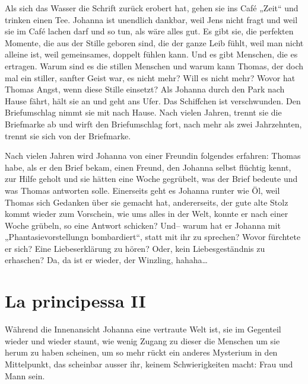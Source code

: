 \documentclass[10pt,titlepage,a5paper]{book}
\begin{document}
Als sich das Wasser die Schrift zurück erobert hat, gehen sie ins Café „Zeit“ und trinken einen Tee. Johanna ist unendlich dankbar, weil Jens nicht fragt und weil sie im Café lachen darf und so tun, als wäre alles gut. Es gibt sie, die perfekten Momente, die aus der Stille geboren sind, die der ganze Leib fühlt, weil man nicht alleine ist, weil gemeinsames, doppelt fühlen kann. Und es gibt Menschen, die es ertragen. Warum sind es die stillen Menschen und warum kann Thomas, der doch mal ein stiller, sanfter Geist war, es nicht mehr? Will es nicht mehr? Wovor hat Thomas Angst, wenn diese Stille einsetzt? Als Johanna durch den Park nach Hause fährt, hält sie an und geht ans Ufer. Das Schiffchen ist verschwunden. Den Briefumschlag nimmt sie mit nach Hause. Nach vielen Jahren, trennt sie die Briefmarke ab und wirft den Briefumschlag fort, nach mehr als zwei Jahrzehnten, trennt sie sich von der Briefmarke.

Nach vielen Jahren wird Johanna von einer Freundin folgendes erfahren: Thomas habe, als er den Brief bekam, einen Freund, den Johanna selbst flüchtig kennt, zur Hilfe geholt und sie hätten eine Woche gegrübelt, was der Brief bedeute und was Thomas antworten solle. Einerseits geht es Johanna runter wie Öl, weil Thomas sich Gedanken über sie gemacht hat, andererseits, der gute alte Stolz kommt wieder zum Vorschein, wie ums alles in der Welt, konnte er nach einer Woche grübeln, so eine Antwort schicken? Und– warum hat er Johanna mit „Phantasievorstellungn bombardiert“, statt mit ihr zu sprechen? Wovor fürchtete er sich? Eine Liebeserklärung zu hören? Oder, kein Liebesgeständnis zu erhaschen? Da, da ist er wieder, der Winzling, hahaha\dots 



\section*{La principessa II}




Während die Innenansicht Johanna eine vertraute Welt ist, sie im Gegenteil wieder und wieder staunt, wie wenig Zugang zu dieser die Menschen um sie herum zu haben scheinen, um so mehr rückt ein anderes Mysterium in den Mittelpunkt, das scheinbar ausser ihr, keinem Schwierigkeiten macht: Frau und Mann sein.
\end{document}
